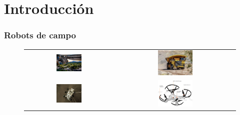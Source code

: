\documentclass{beamer}
\begin{document}
\section{Introducción}
\begin{frame}
\frametitle{Robots de campo}
\begin{figure}
\begin{table}[htbp]
	\centering
	\begin{tabular}{cc}
		\includegraphics[width=0.3\textwidth, valign=m]{figs/strawberry.png} & \includegraphics[width=0.3\textwidth, valign=m]{figs/komatsu.jpeg} \\
		\includegraphics[width=0.3\textwidth, valign=m]{figs/perseverance.jpg} & \includegraphics[width=0.3\textwidth, valign=m]{figs/tello.png} 
	\end{tabular}
\end{table}
\end{figure}
\end{frame}

\end{document}
